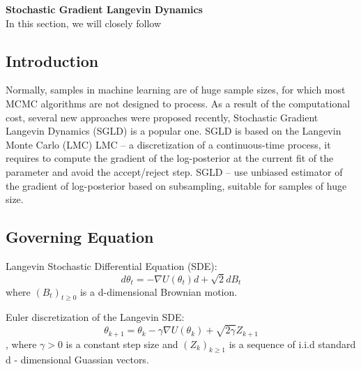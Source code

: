 






% 


\normalsize
\textbf{Stochastic Gradient Langevin Dynamics}\\
In this section, we will closely follow\cite{pitfalls}



\subsection{Introduction}

Normally, samples in machine learning are of huge sample sizes, for which most MCMC algorithms are not designed to process. 
As a result of the computational cost, several new approaches were proposed recently, Stochastic Gradient Langevin Dynamics (SGLD) is a popular one. 
SGLD is based on the Langevin Monte Carlo (LMC)
LMC – a discretization of a continuous-time process, it requires to compute the gradient of the log-posterior at the current fit of the parameter and avoid the accept/reject step.
SGLD – use unbiased estimator of the gradient of log-posterior based on subsampling, suitable for samples of huge size. 


\subsection{Governing Equation}

Langevin Stochastic Differential Equation (SDE):$$d\theta_t = -\nabla U(\theta_t)d +\sqrt{2}d B_t$$ where $(B_t)_{t \geq 0}$ is a d-dimensional Brownian motion. 

Euler discretization of the Langevin SDE:
$$\theta_{k+1} = \theta_k - \gamma \nabla U(\theta_k)+\sqrt{2\gamma} Z_{k+1}$$, where $\gamma > 0$ is a constant step size and $(Z_k)_{k\geq1}$ is a sequence of i.i.d standard d - dimensional Guassian vectors. 

